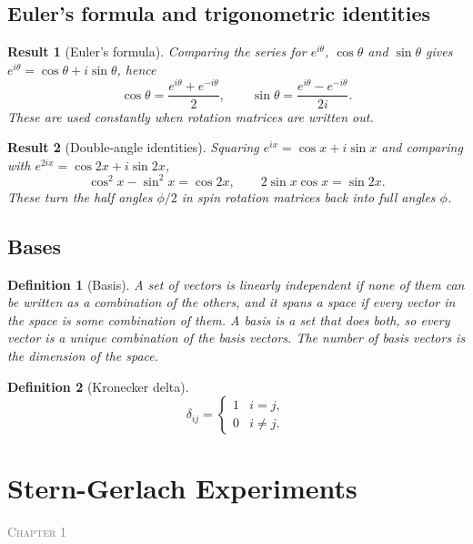\documentclass{article}
\newtheorem{definition}{Definition}
\newtheorem{result}{Result}
\newcommand{\chapterstart}[1]{\noindent\hfill{\small\scshape\textcolor{gray}{Chapter #1}}\par}
\begin{document}
\subsection{Euler's formula and trigonometric identities}
\begin{result}[Euler's formula]
    Comparing the series for $e^{i\theta}$, $\cos\theta$ and $\sin\theta$ gives $e^{i\theta} = \cos\theta + i\sin\theta$, hence
    \begin{equation}
        \cos\theta = \frac{e^{i\theta}+e^{-i\theta}}{2}, \qquad \sin\theta = \frac{e^{i\theta}-e^{-i\theta}}{2i}.
    \end{equation}
    These are used constantly when rotation matrices are written out.
\end{result}
\begin{result}[Double-angle identities]
    Squaring $e^{ix} = \cos x + i\sin x$ and comparing with $e^{2ix} = \cos 2x + i\sin 2x$,
    \begin{equation}
        \cos^2 x - \sin^2 x = \cos 2x, \qquad 2\sin x\cos x = \sin 2x.
    \end{equation}
    These turn the half angles $\phi/2$ in spin rotation matrices back into full angles $\phi$.
\end{result}

\subsection{Bases}
\begin{definition}[Basis]
    A set of vectors is \emph{linearly independent} if none of them can be written as a combination of the others, and it \emph{spans} a space if every vector in the space is some combination of them. A \emph{basis} is a set that does both, so every vector is a unique combination of the basis vectors. The number of basis vectors is the dimension of the space.
\end{definition}
\begin{definition}[Kronecker delta]
    \begin{equation}
        \delta_{ij} = \begin{cases} 1 & i = j, \\ 0 & i \neq j. \end{cases}
    \end{equation}
\end{definition}


\section{Stern-Gerlach Experiments}
\chapterstart{1}
\end{document}
